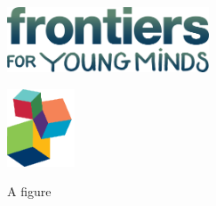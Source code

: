\documentclass[utf8]{frontiers_suppmat} %
\begin{document}
\begin{figure}[h!]
\begin{minipage}[b]{.5\linewidth}
\centering\includegraphics[width=6cm]{YM-logo}%
\label{fig:2a}
\end{minipage}%
\begin{minipage}[b]{.5\linewidth}
\centering\includegraphics[width=2cm]{logo2}%
\label{fig:2b}
\end{minipage}
\caption{A figure}\label{fig:2b}
\end{figure}




%
\end{document}
